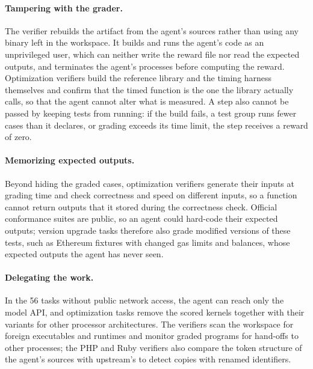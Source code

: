\documentclass{article}
\begin{document}
\paragraph{Tampering with the grader.}
The verifier rebuilds the artifact from the agent's sources rather than using
any binary left in the workspace. It builds and runs the agent's code as an
unprivileged user, which can neither write the reward file nor read the
expected outputs, and terminates the agent's processes before computing the
reward. Optimization verifiers build the reference library and the timing
harness themselves and confirm that the timed function is the one the library
actually calls, so that the agent cannot alter what is measured. A step also
cannot be passed by
keeping tests from running: if the build fails, a test group runs fewer cases
than it declares, or grading exceeds its time limit, the step receives a reward
of zero.

\paragraph{Memorizing expected outputs.}
Beyond hiding the graded cases, optimization verifiers
generate their inputs at grading time and check
correctness and speed on different inputs, so a function cannot return outputs
that it stored during the correctness check. Official conformance suites are
public, so an agent could hard-code their expected outputs; version upgrade
tasks therefore also grade modified versions of these tests, such as Ethereum
fixtures with changed gas limits and balances, whose expected outputs the agent
has never seen.

\paragraph{Delegating the work.}
In the 56 tasks without public network access, the agent can reach only the
model API, and optimization tasks remove the scored kernels together with their
variants for other processor architectures. The verifiers scan the workspace
for foreign executables and runtimes and monitor graded programs for hand-offs
to other processes; the PHP and Ruby verifiers also compare the token structure
of the agent's sources with upstream's to detect copies with renamed
identifiers.
\end{document}
